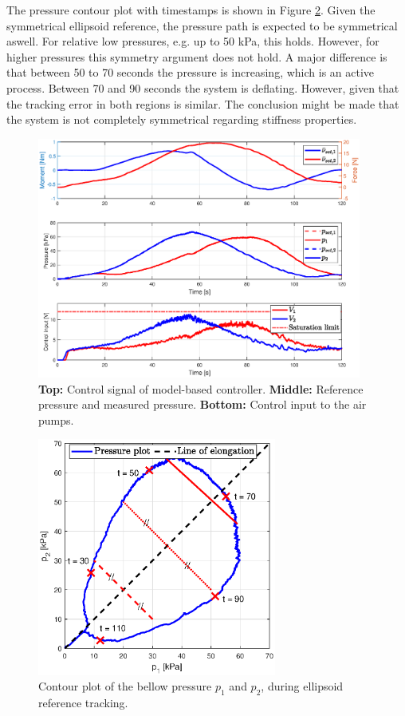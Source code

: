 The pressure contour plot with timestamps is shown in Figure \ref{fig5:pressureellips}. Given the symmetrical ellipsoid reference, the pressure path is expected to be symmetrical aswell. For relative low pressures, e.g. up to 50 kPa, this holds. However, for higher pressures this symmetry argument does not hold. A major difference is that between 50 to 70 seconds the pressure is increasing, which is an active process. Between 70 and 90 seconds the system is deflating. However, given that the tracking error in both regions is similar. The conclusion might be made that the system is not completely symmetrical regarding stiffness properties. 




\begin{figure}[H]
    \centering
    \includegraphics[width = 0.95\textwidth]{Figures/Chapter5/inputsellips.eps}
    \caption{\textbf{Top:} Control signal of model-based controller. \textbf{Middle:} Reference pressure and measured pressure. \textbf{Bottom:} Control input to the air pumps.}
    \label{fig5:controlellips}
\end{figure}




\begin{figure}[H] 
       \centering
    \includegraphics[width = 0.7\textwidth]{Figures/Chapter5/pcontourellips.eps}
    \caption{Contour plot of the bellow pressure $p_1$ and $p_2$, during ellipsoid reference tracking.}
    \label{fig5:pressureellips}
\end{figure}

